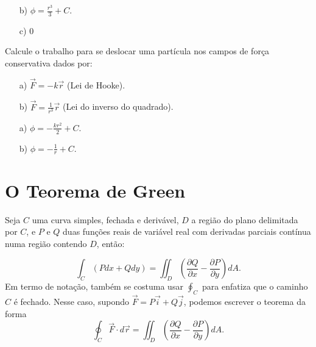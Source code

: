 \begin{resp}
 \begin{itemize}
  \item[b)] $\phi=\frac{r^3}{3}+C$.
  \item[c)] $0$
 \end{itemize}
 \end{resp}

 \begin{exer}
  Calcule o trabalho para se deslocar uma partícula nos campos de força conservativa dados por:
  \begin{itemize}
   \item[a)] $\vec{F}=-k\vec{r}$ (Lei de Hooke).
   \item[b)] $\vec{F}=\frac{1}{r^3}\vec{r}$ (Lei do inverso do quadrado).
  \end{itemize}
 \end{exer}
\begin{resp}
   \begin{itemize}
   \item[a)] $\phi=-\frac{k r^2}{2}+C$.
   \item[b)] $\phi=-\frac{1}{r}+C$.
  \end{itemize}
\end{resp}



\section{O Teorema de Green}
\begin{teo}
 Seja $C$ uma curva simples, fechada e derivável, $D$ a região do plano delimitada por $C$, e $P$ e $Q$ duas funções reais de variável real com derivadas parciais contínua numa região contendo $D$, então:

$$\int_{C} (P dx + Q dy) = \iint_{D} \left(\frac{\partial Q}{\partial x} - \frac{\partial P}{\partial
y}\right) dA.
$$
Em termo de notação, também se costuma usar $\oint_C$ para enfatiza que o caminho $C$ é fechado. Nesse caso, supondo $\vec{F}=P\vec{i}+Q\vec{j}$, podemos escrever o teorema da forma
$$
\oint_C  \vec{F} \cdot d\vec{r}=\iint_{D} \left(\frac{\partial Q}{\partial x} - \frac{\partial P}{\partial
y}\right) dA.
$$
\end{teo}


